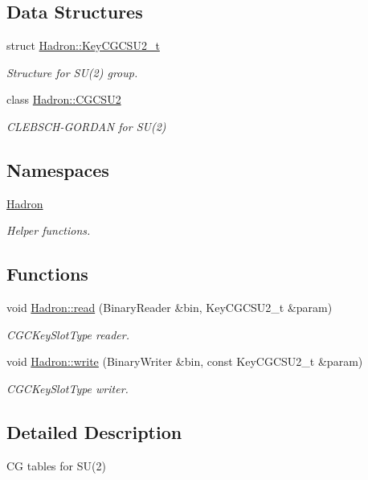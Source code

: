 \subsection*{Data Structures}
\begin{DoxyCompactItemize}
\item 
struct \mbox{\hyperlink{structHadron_1_1KeyCGCSU2__t}{Hadron\+::\+Key\+C\+G\+C\+S\+U2\+\_\+t}}
\begin{DoxyCompactList}\small\item\em Structure for S\+U(2) group. \end{DoxyCompactList}\item 
class \mbox{\hyperlink{classHadron_1_1CGCSU2}{Hadron\+::\+C\+G\+C\+S\+U2}}
\begin{DoxyCompactList}\small\item\em C\+L\+E\+B\+S\+C\+H-\/\+G\+O\+R\+D\+AN for S\+U(2) \end{DoxyCompactList}\end{DoxyCompactItemize}
\subsection*{Namespaces}
\begin{DoxyCompactItemize}
\item 
 \mbox{\hyperlink{namespaceHadron}{Hadron}}
\begin{DoxyCompactList}\small\item\em Helper functions. \end{DoxyCompactList}\end{DoxyCompactItemize}
\subsection*{Functions}
\begin{DoxyCompactItemize}
\item 
void \mbox{\hyperlink{namespaceHadron_a5f60c1536ae1aac0334573f8a80eb687}{Hadron\+::read}} (Binary\+Reader \&bin, Key\+C\+G\+C\+S\+U2\+\_\+t \&param)
\begin{DoxyCompactList}\small\item\em C\+G\+C\+Key\+Slot\+Type reader. \end{DoxyCompactList}\item 
void \mbox{\hyperlink{namespaceHadron_aeadf04c31606521c48ee674d28e2ca3e}{Hadron\+::write}} (Binary\+Writer \&bin, const Key\+C\+G\+C\+S\+U2\+\_\+t \&param)
\begin{DoxyCompactList}\small\item\em C\+G\+C\+Key\+Slot\+Type writer. \end{DoxyCompactList}\end{DoxyCompactItemize}


\subsection{Detailed Description}
CG tables for S\+U(2) 

